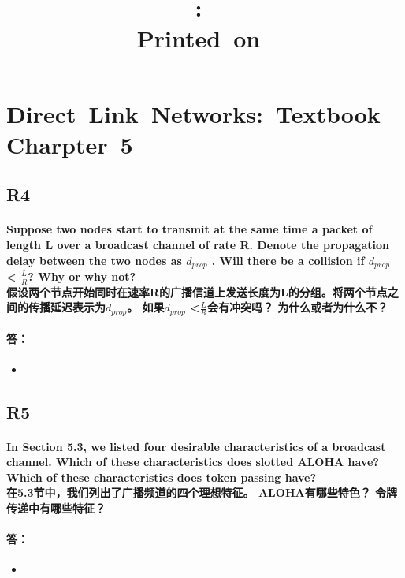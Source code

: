 \documentclass[a4paper]{ctexart}
\title{
    \vspace{2in}
    \textmd{\textbf{\hmwkClass:\ \hmwkTitle}}\\
    \normalsize\vspace{0.1in}\small{Printed\ on\ \hmwkDueDate}\\
    \vspace{0.1in}\large{\textit{\hmwkClassInstructor}}
    \vspace{3in}
}
\author{\hmwkAuthorName}
\date{}
\begin{document}
\maketitle

\pagebreak

\section*{Direct\ Link\ Networks:\ Textbook\ Charpter\ 5}

\subsection*{R4}
\paragraph*{Suppose two nodes start to transmit at the same time a packet of length L over a broadcast channel of rate R. Denote the propagation delay between the two nodes as $d_{prop}$ . Will there be a collision if $d_{prop}$ < $\frac{L}{R}$? Why or why not? \\
假设两个节点开始同时在速率R的广播信道上发送长度为L的分组。将两个节点之间的传播延迟表示为$d_{prop}$。 如果$d_{prop}$ <$\frac{L}{R}$会有冲突吗？ 为什么或者为什么不？
}
\paragraph*{答：} 
\begin{itemize}
    \item 
\end{itemize}



\subsection*{R5}
\paragraph*{In Section 5.3, we listed four desirable characteristics of a broadcast channel. Which of these characteristics does slotted ALOHA have? Which of these characteristics does token passing have?\\
在5.3节中，我们列出了广播频道的四个理想特征。 ALOHA有哪些特色？ 令牌传递中有哪些特征？
}
\paragraph*{答：} 
\begin{itemize}
    \item 
\end{itemize}
\end{document}

